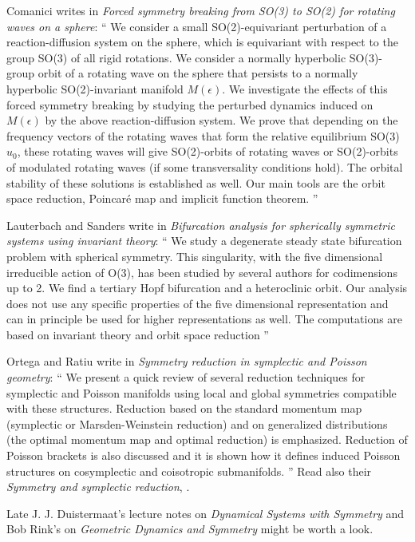 \begin{description}
Comanici writes in \emph{Forced symmetry breaking from SO(3) to SO(2) for rotating
            waves on a sphere}: ``
We consider a small SO(2)-equivariant perturbation of a
reaction-diffusion system on the sphere, which is equivariant with
respect to the group SO(3) of all rigid rotations. We consider a normally
hyperbolic SO(3)-group orbit of a rotating wave on the sphere that
persists to a normally hyperbolic SO(2)-invariant manifold $M(\epsilon)$.
We investigate the effects of this forced symmetry breaking by studying
the perturbed dynamics induced on $M(\epsilon)$ by the above
reaction-diffusion system. We prove that depending on the frequency
vectors of the rotating waves that form the relative equilibrium
SO(3) $u_{0}$, these rotating waves will give SO(2)-orbits of rotating waves
or SO(2)-orbits of modulated rotating waves (if some transversality
conditions hold). The orbital stability of these solutions is established
as well. Our main tools are the orbit space reduction, Poincar\'e map and
implicit function theorem.
''

Lauterbach and Sanders write in \emph{Bifurcation analysis for
spherically symmetric systems using invariant theory}: ``
We study a degenerate steady state bifurcation problem with spherical
symmetry. This singularity, with the five dimensional irreducible action
of O(3), has been studied by several authors for codimensions up to 2.
We find a tertiary Hopf bifurcation and a
heteroclinic orbit. Our analysis does not use any specific properties of
the five dimensional representation and can in principle be used for
higher representations as well. The computations are based on invariant
theory and orbit space reduction
''

Ortega and Ratiu write in
\emph{Symmetry reduction in symplectic and {Poisson} geometry}: ``
We present a quick review of several reduction techniques for symplectic
and Poisson manifolds using local and global symmetries compatible with
these structures. Reduction based on the standard momentum map
(symplectic or Marsden-Weinstein reduction) and on generalized
distributions (the optimal momentum map and optimal reduction) is
emphasized. Reduction of Poisson brackets is also discussed and it is
shown how it defines induced Poisson structures on cosymplectic and
coisotropic submanifolds.
''
Read also their \emph{Symmetry and symplectic reduction}, .

Late J. J. Duistermaat's
{lecture notes} on \emph{Dynamical Systems with Symmetry} and Bob Rink's
 on
\emph{Geometric Dynamics and Symmetry} might be worth a look.


\end{description}
